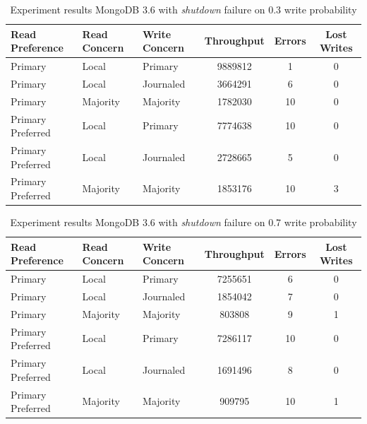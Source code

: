 \documentclass[12pt]{article}
\begin{document}
\begin{table}
    \begin{tabular}{@{}lllccc@{}}
      \hline
        Read Preference  & Read Concern & Write Concern & Throughput & Errors & Lost Writes \\
        \hline
        Primary          & Local        & Primary       & 9889812     & 1  & 0        \\
        Primary          & Local        & Journaled     & 3664291     & 6  & 0        \\
        Primary          & Majority     & Majority      & 1782030     & 10  & 0           \\
        Primary Preferred & Local        & Primary       & 7774638     & 10   & 0        \\
        Primary Preferred & Local        & Journaled     & 2728665     & 5    & 0         \\
        Primary Preferred & Majority     & Majority      & 1853176     & 10   & 3           \\
        \hline
        \end{tabular}
    \caption{Experiment results MongoDB 3.6 with \textit{shutdown} failure on 0.3 write probability}
\end{table}

\begin{table}
    \begin{tabular}{@{}lllccc@{}}
      \hline
        Read Preference  & Read Concern & Write Concern & Throughput & Errors & Lost Writes \\
        \hline
        Primary          & Local        & Primary       & 7255651     & 6  & 0        \\
        Primary          & Local        & Journaled     & 1854042     & 7  & 0        \\
        Primary          & Majority     & Majority      & 803808     & 9  & 1           \\
        Primary Preferred & Local        & Primary       & 7286117     & 10   & 0        \\
        Primary Preferred & Local        & Journaled     & 1691496     & 8    & 0         \\
        Primary Preferred & Majority     & Majority      & 909795     & 10   & 1           \\
        \hline
        \end{tabular}
    \caption{Experiment results MongoDB 3.6 with \textit{shutdown} failure on 0.7 write probability}
\end{table}
\end{document}
